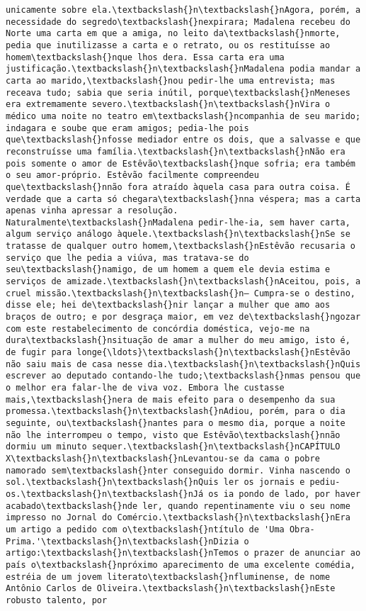 \begin{Verbatim}[commandchars=\\\{\}]
unicamente sobre ela.\textbackslash{}n\textbackslash{}nAgora, porém, a necessidade do segredo\textbackslash{}nexpirara; Madalena recebeu do Norte uma carta em que a amiga, no leito da\textbackslash{}nmorte, pedia que inutilizasse a carta e o retrato, ou os restituísse ao homem\textbackslash{}nque lhos dera. Essa carta era uma justificação.\textbackslash{}n\textbackslash{}nMadalena podia mandar a carta ao marido,\textbackslash{}nou pedir-lhe uma entrevista; mas receava tudo; sabia que seria inútil, porque\textbackslash{}nMeneses era extremamente severo.\textbackslash{}n\textbackslash{}nVira o médico uma noite no teatro em\textbackslash{}ncompanhia de seu marido; indagara e soube que eram amigos; pedia-lhe pois que\textbackslash{}nfosse mediador entre os dois, que a salvasse e que reconstruísse uma família.\textbackslash{}n\textbackslash{}nNão era pois somente o amor de Estêvão\textbackslash{}nque sofria; era também o seu amor-próprio. Estêvão facilmente compreendeu que\textbackslash{}nnão fora atraído àquela casa para outra coisa. É verdade que a carta só chegara\textbackslash{}nna véspera; mas a carta apenas vinha apressar a resolução. Naturalmente\textbackslash{}nMadalena pedir-lhe-ia, sem haver carta, algum serviço análogo àquele.\textbackslash{}n\textbackslash{}nSe se tratasse de qualquer outro homem,\textbackslash{}nEstêvão recusaria o serviço que lhe pedia a viúva, mas tratava-se do seu\textbackslash{}namigo, de um homem a quem ele devia estima e serviços de amizade.\textbackslash{}n\textbackslash{}nAceitou, pois, a cruel missão.\textbackslash{}n\textbackslash{}n— Cumpra-se o destino, disse ele; hei de\textbackslash{}nir lançar a mulher que amo aos braços de outro; e por desgraça maior, em vez de\textbackslash{}ngozar com este restabelecimento de concórdia doméstica, vejo-me na dura\textbackslash{}nsituação de amar a mulher do meu amigo, isto é, de fugir para longe{\ldots}\textbackslash{}n\textbackslash{}nEstêvão não saiu mais de casa nesse dia.\textbackslash{}n\textbackslash{}nQuis escrever ao deputado contando-lhe tudo;\textbackslash{}nmas pensou que o melhor era falar-lhe de viva voz. Embora lhe custasse mais,\textbackslash{}nera de mais efeito para o desempenho da sua promessa.\textbackslash{}n\textbackslash{}nAdiou, porém, para o dia seguinte, ou\textbackslash{}nantes para o mesmo dia, porque a noite não lhe interrompeu o tempo, visto que Estêvão\textbackslash{}nnão dormiu um minuto sequer.\textbackslash{}n\textbackslash{}nCAPÍTULO X\textbackslash{}n\textbackslash{}nLevantou-se da cama o pobre namorado sem\textbackslash{}nter conseguido dormir. Vinha nascendo o sol.\textbackslash{}n\textbackslash{}nQuis ler os jornais e pediu-os.\textbackslash{}n\textbackslash{}nJá os ia pondo de lado, por haver acabado\textbackslash{}nde ler, quando repentinamente viu o seu nome impresso no Jornal do Comércio.\textbackslash{}n\textbackslash{}nEra um artigo a pedido com o\textbackslash{}ntítulo de 'Uma Obra-Prima.'\textbackslash{}n\textbackslash{}nDizia o artigo:\textbackslash{}n\textbackslash{}nTemos o prazer de anunciar ao país o\textbackslash{}npróximo aparecimento de uma excelente comédia, estréia de um jovem literato\textbackslash{}nfluminense, de nome Antônio Carlos de Oliveira.\textbackslash{}n\textbackslash{}nEste robusto talento, por 
\end{Verbatim}
